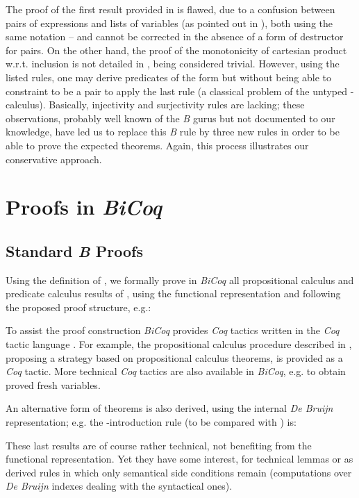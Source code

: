 \documentclass{llncs}
\begin{document}
The proof of the first result provided in \cite{abr:1} is flawed, due to a confusion between 
pairs of expressions and lists of variables (as pointed out in \cite{mus:1}), both using the 
same notation -- and cannot be corrected in the absence of a form of destructor for pairs. On 
the other hand, the proof of the monotonicity of cartesian product w.r.t. inclusion is not 
detailed in \cite{abr:1}, being considered trivial. However, using the listed rules, one may 
derive predicates of the form  but without being able to constraint  
to be a pair to apply the last rule (a classical problem of the untyped -calculus). 
Basically, injectivity and surjectivity rules are lacking; these observations, probably well 
known of the \emph{B} gurus but not documented to our knowledge, have led us to replace this 
\emph{B} rule by three new rules in order to be able to prove the expected theorems. Again, 
this process illustrates our conservative approach.

\section{Proofs in \emph{BiCoq}}\label{sc_proofs}

\subsection{Standard \emph{B} Proofs}\label{ss_classic}

Using the definition of , we formally prove in \emph{BiCoq} all propositional calculus 
and predicate calculus results of \cite{abr:1}, using the functional representation and 
following the proposed proof structure, e.g.:


To assist the proof construction \emph{BiCoq} provides \emph{Coq} tactics written in the 
\emph{Coq} tactic language \cite{del:1}. For example, the propositional calculus procedure 
described in \cite{abr:1}, proposing a strategy based on propositional calculus theorems, is 
provided as a \emph{Coq} tactic. More technical \emph{Coq} tactics are also available in 
\emph{BiCoq}, e.g. to obtain proved fresh variables.

An alternative form of theorems is also derived, using the internal \emph{De Bruijn} 
representation; e.g. the -introduction rule (to be compared with 
) is:

These last results are of course rather technical, not benefiting from the functional 
representation. Yet they have some interest, for technical lemmas or as derived rules in which 
only semantical side conditions remain (computations over \emph{De Bruijn} indexes dealing 
with the syntactical ones).
\end{document}
